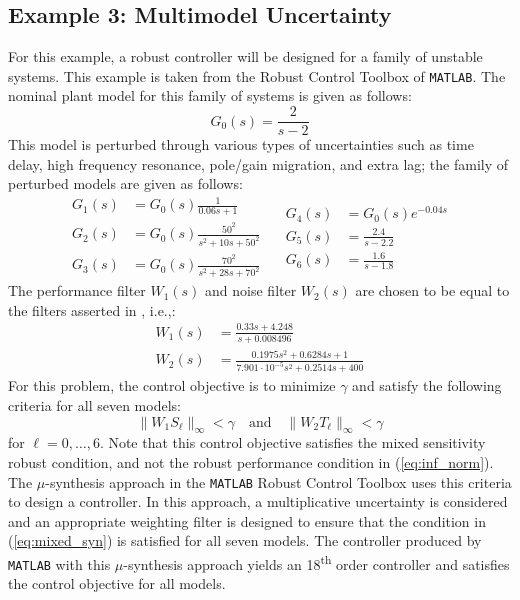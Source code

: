 \documentclass[letterpaper, 10 pt, conference]{ieeeconf}  %
\begin{document}
\subsection{Example 3: Multimodel Uncertainty}
For this example, a robust controller will be designed for a family of unstable systems. This example is taken from the Robust Control Toolbox of \texttt{MATLAB}. The nominal plant model for this family of systems is given as follows:
\begin{equation}
G_0(s) = \frac{2}{s-2}
\end{equation}
This model is perturbed through various types of uncertainties such as time delay, high frequency resonance, pole/gain migration, and extra lag; the family of perturbed models are given as follows:
\begin{equation}
  \begin{split}
    G_1(s) &= G_0(s) \frac{1}{0.06s+1}\\       
    G_2(s) &= G_0(s) \frac{50^2}{s^2+10s+50^2}\\        
    G_3(s) &= G_0(s) \frac{70^2}{s^2+28s+70^2}
  \end{split}
\quad  
  \begin{split}
    G_4(s) &= G_0(s)e^{-0.04s}\\        
    G_5(s) &= \frac{2.4}{s-2.2}\\        
    G_6(s) &= \frac{1.6}{s-1.8}
  \end{split}
\end{equation}
The performance filter $W_1(s)$ and noise filter $W_2(s)$ are chosen to be equal to the filters asserted in \cite{Kar13}, i.e.,:
\begin{equation}
  \begin{split}
    W_1(s) &= \frac{0.33s+4.248}{s+0.008496}\\       
    W_2(s) &= \frac{0.1975s^2+0.6284s+1}{7.901\cdot 10^{-5}s^2+0.2514s+400}
  \end{split}
\end{equation}
For this problem, the control objective is to minimize $\gamma$ and satisfy the following criteria for all seven models:
\begin{equation} \label{eq:mixed_syn}
\|W_1S_{\ell} \|_{\infty} < \gamma \quad \mbox{and} \quad \|W_2T_{\ell} \|_{\infty} < \gamma
\end{equation}
for ${\ell} = 0,\ldots,6$. Note that this control objective satisfies the mixed sensitivity robust condition, and not the robust performance condition in (\ref{eq:inf_norm}). The $\mu$-synthesis approach in the \texttt{MATLAB} Robust Control Toolbox uses this criteria to design a controller. In this approach, a multiplicative uncertainty is considered and an appropriate weighting filter is designed to ensure that the condition in (\ref{eq:mixed_syn}) is satisfied for all seven models. The controller produced by \texttt{MATLAB} with this $\mu$-synthesis approach yields an 18\textsuperscript{th} order controller and satisfies the control objective for all models. 
\end{document}
